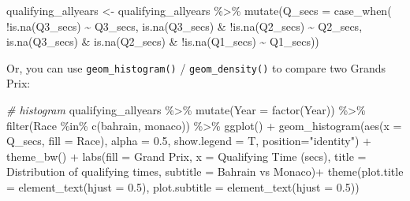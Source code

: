 \documentclass[
]{book}
\newenvironment{Shaded}{\begin{snugshade}}{\end{snugshade}}
\newcommand{\AttributeTok}[1]{\textcolor[rgb]{0.77,0.63,0.00}{#1}}
\newcommand{\CommentTok}[1]{\textcolor[rgb]{0.56,0.35,0.01}{\textit{#1}}}
\newcommand{\FloatTok}[1]{\textcolor[rgb]{0.00,0.00,0.81}{#1}}
\newcommand{\FunctionTok}[1]{\textcolor[rgb]{0.00,0.00,0.00}{#1}}
\newcommand{\NormalTok}[1]{#1}
\newcommand{\OtherTok}[1]{\textcolor[rgb]{0.56,0.35,0.01}{#1}}
\newcommand{\SpecialCharTok}[1]{\textcolor[rgb]{0.00,0.00,0.00}{#1}}
\newcommand{\StringTok}[1]{\textcolor[rgb]{0.31,0.60,0.02}{#1}}
\begin{document}
\begin{Shaded}
\begin{Highlighting}[]
\NormalTok{qualifying\_allyears }\OtherTok{\textless{}{-}}\NormalTok{ qualifying\_allyears }\SpecialCharTok{\%\textgreater{}\%}
  \FunctionTok{mutate}\NormalTok{(}\AttributeTok{Q\_secs =} \FunctionTok{case\_when}\NormalTok{(}
    \SpecialCharTok{!}\FunctionTok{is.na}\NormalTok{(Q3\_secs) }\SpecialCharTok{\textasciitilde{}}\NormalTok{ Q3\_secs,}
    \FunctionTok{is.na}\NormalTok{(Q3\_secs) }\SpecialCharTok{\&} \SpecialCharTok{!}\FunctionTok{is.na}\NormalTok{(Q2\_secs) }\SpecialCharTok{\textasciitilde{}}\NormalTok{ Q2\_secs,}
    \FunctionTok{is.na}\NormalTok{(Q3\_secs) }\SpecialCharTok{\&} \FunctionTok{is.na}\NormalTok{(Q2\_secs) }\SpecialCharTok{\&} \SpecialCharTok{!}\FunctionTok{is.na}\NormalTok{(Q1\_secs) }\SpecialCharTok{\textasciitilde{}}\NormalTok{ Q1\_secs)) }
\end{Highlighting}
\end{Shaded}

Or, you can use \texttt{geom\_histogram()} / \texttt{geom\_density()} to compare two Grands Prix:

\begin{Shaded}
\begin{Highlighting}[]
\CommentTok{\# histogram}
\NormalTok{qualifying\_allyears }\SpecialCharTok{\%\textgreater{}\%}
  \FunctionTok{mutate}\NormalTok{(}\AttributeTok{Year =} \FunctionTok{factor}\NormalTok{(Year)) }\SpecialCharTok{\%\textgreater{}\%}
  \FunctionTok{filter}\NormalTok{(Race }\SpecialCharTok{\%in\%} \FunctionTok{c}\NormalTok{(}\StringTok{\textquotesingle{}bahrain\textquotesingle{}}\NormalTok{, }\StringTok{\textquotesingle{}monaco\textquotesingle{}}\NormalTok{)) }\SpecialCharTok{\%\textgreater{}\%}
  \FunctionTok{ggplot}\NormalTok{() }\SpecialCharTok{+}
  \FunctionTok{geom\_histogram}\NormalTok{(}\FunctionTok{aes}\NormalTok{(}\AttributeTok{x =}\NormalTok{ Q\_secs, }\AttributeTok{fill =}\NormalTok{ Race),}
                 \AttributeTok{alpha =} \FloatTok{0.5}\NormalTok{, }\AttributeTok{show.legend =}\NormalTok{ T,}
                 \AttributeTok{position=}\StringTok{"identity"}\NormalTok{) }\SpecialCharTok{+}
  \FunctionTok{theme\_bw}\NormalTok{() }\SpecialCharTok{+}
  \FunctionTok{labs}\NormalTok{(}\AttributeTok{fill =} \StringTok{\textquotesingle{}Grand Prix\textquotesingle{}}\NormalTok{,}
       \AttributeTok{x =} \StringTok{\textquotesingle{}Qualifying Time (secs)\textquotesingle{}}\NormalTok{,}
       \AttributeTok{title =} \StringTok{\textquotesingle{}Distribution of qualifying times\textquotesingle{}}\NormalTok{,}
       \AttributeTok{subtitle =} \StringTok{\textquotesingle{}Bahrain vs Monaco\textquotesingle{}}\NormalTok{)}\SpecialCharTok{+}
  \FunctionTok{theme}\NormalTok{(}\AttributeTok{plot.title =} \FunctionTok{element\_text}\NormalTok{(}\AttributeTok{hjust =} \FloatTok{0.5}\NormalTok{),}
        \AttributeTok{plot.subtitle =} \FunctionTok{element\_text}\NormalTok{(}\AttributeTok{hjust =} \FloatTok{0.5}\NormalTok{)) }
\end{Highlighting}
\end{Shaded}
\end{document}
